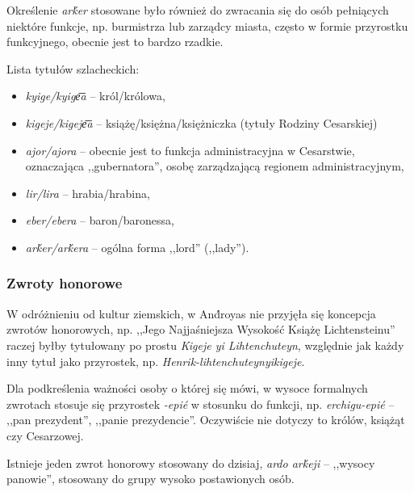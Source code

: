 \begin{spacing}{1.1}


Określenie \emph{arḱer} stosowane było również do zwracania się do osób
pełniących niektóre funkcje, np. burmistrza lub zarządcy miasta, często w formie
przyrostku funkcyjnego, obecnie jest to bardzo rzadkie.

Lista tytułów szlacheckich:

\begin{itemize}
	\item \emph{kyige/kyige͞a} -- król/królowa,
	\item \emph{kigeje/kigeje͞a} -- książę/księżna/księżniczka (tytuły Rodziny
	Cesarskiej)
	\item \emph{ajor/ajora} -- obecnie jest to funkcja administracyjna w
	Cesarstwie, oznaczająca ,,gubernatora'', osobę zarządzającą regionem
	administracyjnym,
	\item \emph{lir/lira} -- hrabia/hrabina,
	\item \emph{eber/ebera} -- baron/baronessa,	
	\item \emph{arḱer/arḱera} -- ogólna forma ,,lord'' (,,lady'').
\end{itemize}

\subsubsection{Zwroty honorowe}

W odróżnieniu od kultur ziemskich, w And́royas nie przyjęła się koncepcja
zwrotów honorowych, np. ,,Jego Najjaśniejsza Wysokość Książę Lichtensteinu''
raczej byłby tytułowany po prostu \emph{Kigeje yi Lihtenchuteyn}, względnie jak
każdy inny tytuł jako przyrostek, np. \emph{Henrik-lihtenchuteynyikigeje}.

Dla podkreślenia ważności osoby o której się mówi, w wysoce formalnych zwrotach
stosuje się przyrostek \emph{-epié} w stosunku do funkcji, np.
\emph{erchigu-epié} -- ,,pan prezydent'', ,,panie prezydencie''. Oczywiście nie
dotyczy to królów, książąt czy Cesarzowej.

Istnieje jeden zwrot honorowy stosowany do dzisiaj, \emph{ardo arḱeji} --
,,wysocy panowie'', stosowany do grupy wysoko postawionych osób.


\end{spacing}

